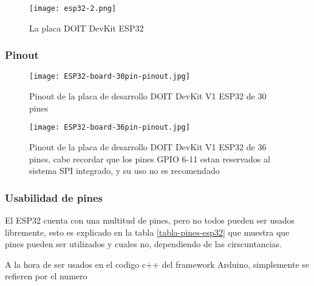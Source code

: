 \documentclass[../informe_krapp.tex]{subfiles}
\begin{document}
\begin{figure}[H]
	\texttt{[image: esp32-2.png]}
	\centering
	\caption{La placa DOIT DevKit ESP32}
\end{figure}

\clearpage

\subsubsection{Pinout}
\begin{figure}[H]
	\texttt{[image: ESP32-board-30pin-pinout.jpg]}
	\centering
	\caption{Pinout de la placa de desarrollo DOIT DevKit V1 ESP32 de 30 pines}
\end{figure}

\begin{figure}[H]
	\texttt{[image: ESP32-board-36pin-pinout.jpg]}
	\centering
	\caption{Pinout de la placa de desarrollo DOIT DevKit V1 ESP32 de 36 pines,
		cabe recordar que los pines GPIO 6-11 estan reservados al sistema SPI integrado, y su
		uso no es recomendado}
\end{figure}
\subsubsection{Usabilidad de pines}
El ESP32 cuenta con una multitud de pines, pero no todos pueden ser usados libremente,
esto es explicado en la tabla \ref{tabla-pines-esp32} que muestra que pines pueden ser utilizados y cuales no,
dependiendo de las cirscuntancias.

A la hora de ser usados en el codigo c++ del framework Arduino, simplemente se refieren
por el numero
\end{document}
